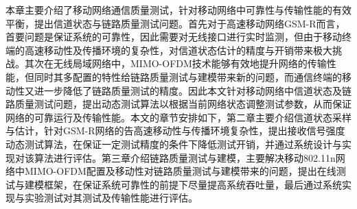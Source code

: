 本章主要介绍了移动网络通信质量测试，针对移动网络中可靠性与传输性能的有效平衡，提出信道状态与链路质量测试问题。首先对于高速移动网络GSM-R而言，首要问题是保证系统的可靠性，因此需要对无线接口进行实时监测，但由于移动终端的高速移动性及传播环境的复杂性，对信道状态估计的精度与开销带来极大挑战。其次在无线局域网络中，MIMO-OFDM技术能够有效地提升网络的传输性能，但同时其多配置的特性给链路质量测试与建模带来新的问题，而通信终端的移动性又进一步降低了链路质量测试的精度。因此本文针对移动网络中信道状态及链路质量测试问题，提出动态测试算法以根据当前网络状态调整测试参数，从而保证网络的可靠运行及传输性能。本文的章节安排如下，第二章主要介绍信道状态采样与估计，针对GSM-R网络的告高速移动性与传播环境复杂性，提出接收信号强度动态测试算法，在保证一定测试精度的条件下降低测试开销，并通过系统设计与实现对该算法进行评估。第三章介绍链路质量测试与建模，主要解决移动802.11n网络中MIMO-OFDM配置及移动性对链路质量测试与建模带来的问题，提出在线测试与建模框架，在保证系统可靠性的前提下尽量提高系统吞吐量，最后通过系统实现与实验测试对其测试及传输性能进行评估。